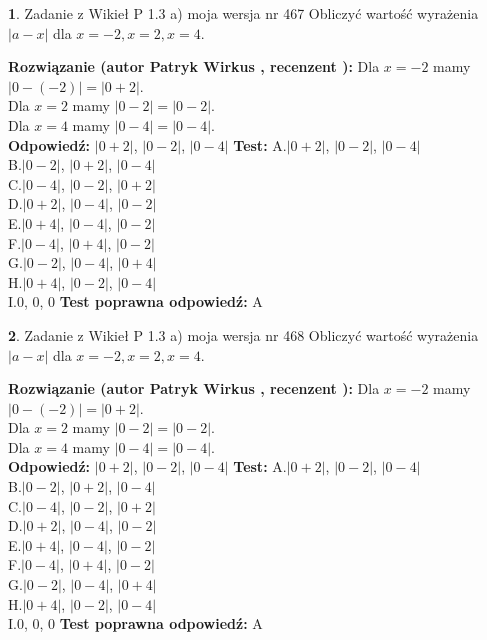 \documentclass[12pt, a4paper]{article}
\theoremstyle{definition} %
\newtheorem{zad}{}
\newcommand{\zadStart}[1]{\begin{zad}#1\newline}
\newcommand{\zadStop}{\end{zad}}
\newcommand{\rozwStart}[2]{\noindent \textbf{Rozwiązanie (autor #1 , recenzent #2): }\newline}
\newcommand{\rozwStop}{\newline}
\newcommand{\odpStart}{\noindent \textbf{Odpowiedź:}\newline}
\newcommand{\odpStop}{\newline}
\newcommand{\testStart}{\noindent \textbf{Test:}\newline}
\newcommand{\testStop}{\newline}
\newcommand{\kluczStart}{\noindent \textbf{Test poprawna odpowiedź:}\newline}
\newcommand{\kluczStop}{\newline}
\begin{document}
\zadStart{Zadanie z Wikieł P 1.3 a) moja wersja nr 467}
Obliczyć wartość wyrażenia $|a - x|$ dla $x=-2,x=2,x=4$.
\zadStop
\rozwStart{Patryk Wirkus}{}
Dla $x = -2$ mamy $|0 - (-2)| = |0 + 2|$.\\
Dla $x = 2$ mamy $|0 - 2| = |0 - 2|$.\\
Dla $x = 4$ mamy $|0 - 4| = |0 - 4|$.\\
\rozwStop
\odpStart
$|0 + 2|$, $|0 - 2|$, $|0 - 4|$
\odpStop
\testStart
A.$|0 + 2|$, $|0 - 2|$, $|0 - 4|$\\
B.$|0 - 2|$, $|0 + 2|$, $|0 - 4|$\\
C.$|0 - 4|$, $|0 - 2|$, $|0 + 2|$\\
D.$|0 + 2|$, $|0 - 4|$, $|0 - 2|$\\
E.$|0 + 4|$, $|0 - 4|$, $|0 - 2|$\\
F.$|0 - 4|$, $|0 + 4|$, $|0 - 2|$\\
G.$|0 - 2|$, $|0 - 4|$, $|0 + 4|$\\
H.$|0 + 4|$, $|0 - 2|$, $|0 - 4|$\\
I.$0$, $0$, $0$
\testStop
\kluczStart
A
\kluczStop



\zadStart{Zadanie z Wikieł P 1.3 a) moja wersja nr 468}
Obliczyć wartość wyrażenia $|a - x|$ dla $x=-2,x=2,x=4$.
\zadStop
\rozwStart{Patryk Wirkus}{}
Dla $x = -2$ mamy $|0 - (-2)| = |0 + 2|$.\\
Dla $x = 2$ mamy $|0 - 2| = |0 - 2|$.\\
Dla $x = 4$ mamy $|0 - 4| = |0 - 4|$.\\
\rozwStop
\odpStart
$|0 + 2|$, $|0 - 2|$, $|0 - 4|$
\odpStop
\testStart
A.$|0 + 2|$, $|0 - 2|$, $|0 - 4|$\\
B.$|0 - 2|$, $|0 + 2|$, $|0 - 4|$\\
C.$|0 - 4|$, $|0 - 2|$, $|0 + 2|$\\
D.$|0 + 2|$, $|0 - 4|$, $|0 - 2|$\\
E.$|0 + 4|$, $|0 - 4|$, $|0 - 2|$\\
F.$|0 - 4|$, $|0 + 4|$, $|0 - 2|$\\
G.$|0 - 2|$, $|0 - 4|$, $|0 + 4|$\\
H.$|0 + 4|$, $|0 - 2|$, $|0 - 4|$\\
I.$0$, $0$, $0$
\testStop
\kluczStart
A
\kluczStop
\end{document}
